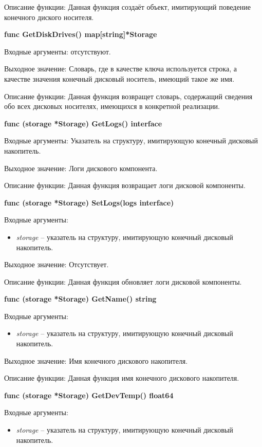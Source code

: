Описание функции: Данная функция создаёт объект, имитирующий поведение конечного диского носителя.

\textbf{func GetDiskDrives() map[string]*Storage}

Входные аргументы: отсутствуют.

Выходное значение: Словарь, где в качестве ключа используется строка, а качестве значения конечный дисковый носитель, имеющий такое же имя.

Описание функции: Данная функция возвращет словарь, содержащий сведения обо всех дисковых носителях, имеющихся в конкретной реализации. 

\textbf{func (storage *Storage) GetLogs() interface{}}

Входные аргументы: Указатель на структуру, имитирующую конечный дисковый накопитель.

Выходное значение: Логи дискового компонента. 

Описание функции: Данная функция возвращает логи дисковой компоненты. 

\textbf{func (storage *Storage) SetLogs(logs interface{})}

Входные аргументы:
\begin{itemize}
	\item \textit{storage} -- указатель на структуру, имитирующую конечный дисковый накопитель.
\end{itemize}
Выходное значение:  Отсутствует.

Описание функции: Данная функция обновляет логи дисковой компоненты. 

\textbf{func (storage *Storage) GetName() string}

Входные аргументы: 
\begin{itemize}
	\item \textit{storage} -- указатель на структуру, имитирующую конечный дисковый накопитель.
\end{itemize}

Выходное значение: Имя конечного дискового накопителя.

Описание функции: Данная функция имя конечного дискового накопителя.

\textbf{func (storage *Storage) GetDevTemp() float64}

Входные аргументы: 
\begin{itemize}
	\item \textit{storage} -- указатель на структуру, имитирующую конечный дисковый накопитель.
\end{itemize}

